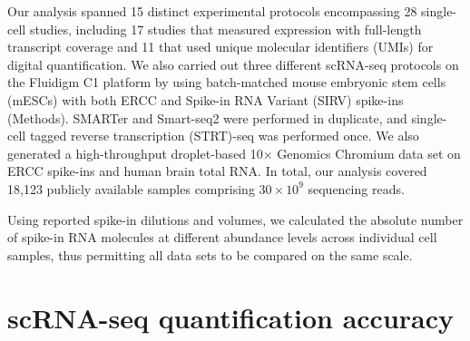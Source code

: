 Our analysis spanned 15 distinct experimental protocols encompassing 28 single-cell studies, including 17 studies that measured expression with full-length transcript coverage and 11 that used unique molecular identifiers (UMIs) for digital quantification. We also carried out three different scRNA-seq protocols on the Fluidigm C1 platform by using batch-matched mouse embryonic stem cells (mESCs) with both ERCC and Spike-in RNA Variant (SIRV) spike-ins (Methods). SMARTer and Smart-seq2 were performed in duplicate, and single-cell tagged reverse transcription (STRT)-seq was performed once. We also generated a high-throughput droplet-based 10× Genomics Chromium data set on ERCC spike-ins and human brain total RNA. In total, our analysis covered 18,123 publicly available samples comprising \( 30 \times 10^9 \) sequencing reads.

Using reported spike-in dilutions and volumes, we calculated the absolute number of spike-in RNA molecules at different abundance levels across individual cell samples, thus permitting all data sets to be compared on the same scale.

\section{scRNA-seq quantification accuracy}

